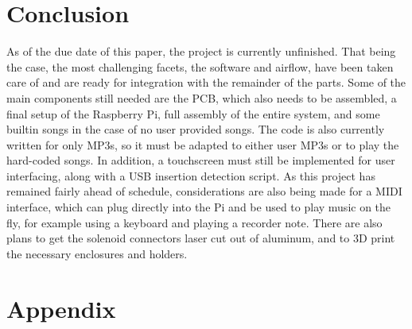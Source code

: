 \documentclass[UTF8, 12pt]{article}
\begin{document}
\section{Conclusion}
    As of the due date of this paper, the project is currently unfinished. That being the case, the most challenging facets, the software and airflow, have been taken care of and are ready for integration with the remainder of the parts. Some of the main components still needed are the PCB, which also needs to be assembled, a final setup of the Raspberry Pi, full assembly of the entire system, and some builtin songs in the case of no user provided songs. The code is also currently written for only MP3s, so it must be adapted to either user MP3s or to play the hard-coded songs. In addition, a touchscreen must still be implemented for user interfacing, along with a USB insertion detection script. As this project has remained fairly ahead of schedule, considerations are also being made for a MIDI interface, which can plug directly into the Pi and be used to play music on the fly, for example using a keyboard and playing a recorder note. There are also plans to get the solenoid connectors laser cut out of aluminum, and to 3D print the necessary enclosures and holders.

\section{Appendix}
\end{document}
